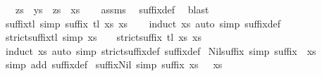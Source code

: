 \begin{isabellebody}
\ \ \ zs\ \ {\isachardoublequoteopen}ys\ {\isacharequal}\ zs\ {\isacharat}\ xs{\isachardoublequoteclose}\isanewline
%
\isadelimproof
\ \ %
\endisadelimproof
%
\isatagproof
{}\isamarkupfalse%
\ assms\ \isamarkupfalse%
\ suffix{\isacharunderscore}def\ \isamarkupfalse%
\ blast%
\endisatagproof
{\isafoldproof}%
%
\isadelimproof
\isanewline
%
\endisadelimproof
\ \ \ \ \isanewline
{}\isamarkupfalse%
\ suffix{\isacharunderscore}tl\ {\isacharbrackleft}simp{\isacharbrackright}{\isacharcolon}\ {\isachardoublequoteopen}suffix\ {\isacharparenleft}tl\ xs{\isacharparenright}\ xs{\isachardoublequoteclose}\isanewline
%
\isadelimproof
\ \ %
\endisadelimproof
%
\isatagproof
{}\isamarkupfalse%
\ {\isacharparenleft}induct\ xs{\isacharparenright}\ {\isacharparenleft}auto\ simp{\isacharcolon}\ suffix{\isacharunderscore}def{\isacharparenright}%
\endisatagproof
{\isafoldproof}%
%
\isadelimproof
\isanewline
%
\endisadelimproof
\isanewline
{}\isamarkupfalse%
\ strict{\isacharunderscore}suffix{\isacharunderscore}tl\ {\isacharbrackleft}simp{\isacharbrackright}{\isacharcolon}\ {\isachardoublequoteopen}xs\ {\isasymnoteq}\ {\isacharbrackleft}{\isacharbrackright}\ {\isasymLongrightarrow}\ strict{\isacharunderscore}suffix\ {\isacharparenleft}tl\ xs{\isacharparenright}\ xs{\isachardoublequoteclose}\isanewline
%
\isadelimproof
\ \ %
\endisadelimproof
%
\isatagproof
{}\isamarkupfalse%
\ {\isacharparenleft}induct\ xs{\isacharparenright}\ {\isacharparenleft}auto\ simp{\isacharcolon}\ strict{\isacharunderscore}suffix{\isacharunderscore}def\ suffix{\isacharunderscore}def{\isacharparenright}%
\endisatagproof
{\isafoldproof}%
%
\isadelimproof
\isanewline
%
\endisadelimproof
\isanewline
{}\isamarkupfalse%
\ Nil{\isacharunderscore}suffix\ {\isacharbrackleft}simp{\isacharbrackright}{\isacharcolon}\ {\isachardoublequoteopen}suffix\ {\isacharbrackleft}{\isacharbrackright}\ xs{\isachardoublequoteclose}\isanewline
%
\isadelimproof
\ \ %
\endisadelimproof
%
\isatagproof
{}\isamarkupfalse%
\ {\isacharparenleft}simp\ add{\isacharcolon}\ suffix{\isacharunderscore}def{\isacharparenright}%
\endisatagproof
{\isafoldproof}%
%
\isadelimproof
\isanewline
%
\endisadelimproof
\isanewline
{}\isamarkupfalse%
\ suffix{\isacharunderscore}Nil\ {\isacharbrackleft}simp{\isacharbrackright}{\isacharcolon}\ {\isachardoublequoteopen}{\isacharparenleft}suffix\ xs\ {\isacharbrackleft}{\isacharbrackright}{\isacharparenright}\ {\isacharequal}\ {\isacharparenleft}xs\ {\isacharequal}\ {\isacharbrackleft}{\isacharbrackright}{\isacharparenright}{\isachardoublequoteclose}\isanewline

\end{isabellebody}
